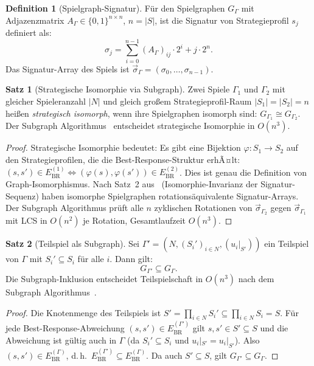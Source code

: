 ﻿\documentclass[a4paper,12pt]{article}
\theoremstyle{definition}
\newtheorem{definition}{Definition}
\newtheorem{satz}{Satz}
\begin{document}
\begin{definition}[Spielgraph-Signatur]
\label{def:spielsig}
F\"ur den Spielgraphen $G_\Gamma$ mit Adjazenzmatrix $A_\Gamma
\in \{0,1\}^{n \times n}$, $n = |S|$, ist die Signatur von
Strategieprofil $s_j$ definiert als:
\[
\sigma_j = \sum_{i=0}^{n-1} (A_\Gamma)_{ij} \cdot 2^i + j \cdot 2^n.
\]
Das Signatur-Array des Spiels ist
$\vec{\sigma}_\Gamma = (\sigma_0, \ldots, \sigma_{n-1})$.
\end{definition}

\begin{satz}[Strategische Isomorphie via Subgraph]
\label{satz:strat_iso}
Zwei Spiele $\Gamma_1$ und $\Gamma_2$ mit gleicher Spieleranzahl $|N|$
und gleich gro{\ss}em Strategieprofil-Raum $|S_1| = |S_2| = n$ hei{\ss}en
\emph{strategisch isomorph}, wenn ihre Spielgraphen isomorph sind:
$G_{\Gamma_1} \cong G_{\Gamma_2}$.
Der Subgraph Algorithmus~\cite{epp2026subgraph} entscheidet strategische
Isomorphie in $O(n^3)$.
\end{satz}

\begin{proof}
Strategische Isomorphie bedeutet: Es gibt eine Bijektion
$\varphi: S_1 \to S_2$ auf den Strategieprofilen, die die
Best-Response-Struktur erhÃ¤lt:
$(s, s') \in E_{\mathrm{BR}}^{(1)} \Leftrightarrow (\varphi(s), \varphi(s')) \in E_{\mathrm{BR}}^{(2)}$.
Dies ist genau die Definition von Graph-Isomorphismus.
Nach Satz~2 aus~\cite{epp2026subgraph} (Isomorphie-Invarianz der
Signatur-Sequenz) haben isomorphe Spielgraphen rotations\"aquivalente
Signatur-Arrays.
Der Subgraph Algorithmus pr\"uft alle $n$ zyklischen Rotationen von
$\vec{\sigma}_{\Gamma_2}$ gegen $\vec{\sigma}_{\Gamma_1}$ mit
LCS in $O(n^2)$ je Rotation, Gesamtlaufzeit $O(n^3)$.
\end{proof}

\begin{satz}[Teilspiel als Subgraph]
\label{satz:teilspiel}
Sei $\Gamma' = (N, (S_i')_{i \in N}, (u_i|_{S'}))$ ein Teilspiel von $\Gamma$
mit $S_i' \subseteq S_i$ f\"ur alle $i$. Dann gilt:
\[
G_{\Gamma'} \subseteq G_\Gamma.
\]
Die Subgraph-Inklusion entscheidet Teilspielschaft in $O(n^3)$ nach
dem Subgraph Algorithmus~\cite{epp2026subgraph}.
\end{satz}

\begin{proof}
Die Knotenmenge des Teilspiels ist
$S' = \prod_{i \in N} S_i' \subseteq \prod_{i \in N} S_i = S$.
F\"ur jede Best-Response-Abweichung $(s, s') \in E_{\mathrm{BR}}^{(\Gamma')}$
gilt $s, s' \in S' \subseteq S$ und die Abweichung ist g\"ultig auch in $\Gamma$
(da $S_i' \subseteq S_i$ und $u_i|_{S'} = u_i|_{S'}$).
Also $(s, s') \in E_{\mathrm{BR}}^{(\Gamma)}$, d.\,h.\
$E_{\mathrm{BR}}^{(\Gamma')} \subseteq E_{\mathrm{BR}}^{(\Gamma)}$.
Da auch $S' \subseteq S$, gilt $G_{\Gamma'} \subseteq G_\Gamma$.
\end{proof}
\end{document}
